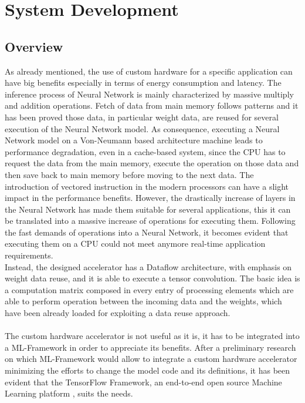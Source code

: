 \chapter{System Development}

\section{Overview}
As already mentioned, the use of custom hardware for a specific application can have big benefits especially in terms of energy consumption and latency.
The inference process of Neural Network is mainly characterized by massive multiply and addition operations. Fetch of data from main memory follows patterns and it has been proved those data, in particular weight data, are reused for several execution of the Neural Network model.
As consequence, executing a Neural Network model on a Von-Neumann based architecture machine leads to performance degradation, even in a cache-based system, since the CPU has to request the data from the main memory, execute the operation on those data and then save back to main memory before moving to the next data. The introduction of vectored instruction in the modern processors can have a slight impact in the performance benefits. However, the drastically increase of layers in the Neural Network has made them suitable for several applications, this it can be translated into a massive increase of operations for executing them. Following the fast demands of operations into a Neural Network, it becomes evident that executing them on a CPU could not meet anymore real-time application requirements.\\
Instead, the designed accelerator has a Dataflow architecture, with emphasis on weight data reuse, and it is able to execute a tensor convolution. The basic idea is a computation matrix composed in every entry of processing elements which are able to perform operation between the incoming data and the weights, which have been already loaded for exploiting a data reuse approach.\\\\
The custom hardware accelerator is not useful as it is, it has to be integrated into a ML-Framework in order to appreciate its benefits. After a preliminary research on which ML-Framework would allow to integrate a custom hardware accelerator minimizing the efforts to change the model code and its definitions, it has been evident that the TensorFlow Framework, an end-to-end open source Machine Learning platform \cite{WEBSITE:4}, suits the needs.\\
